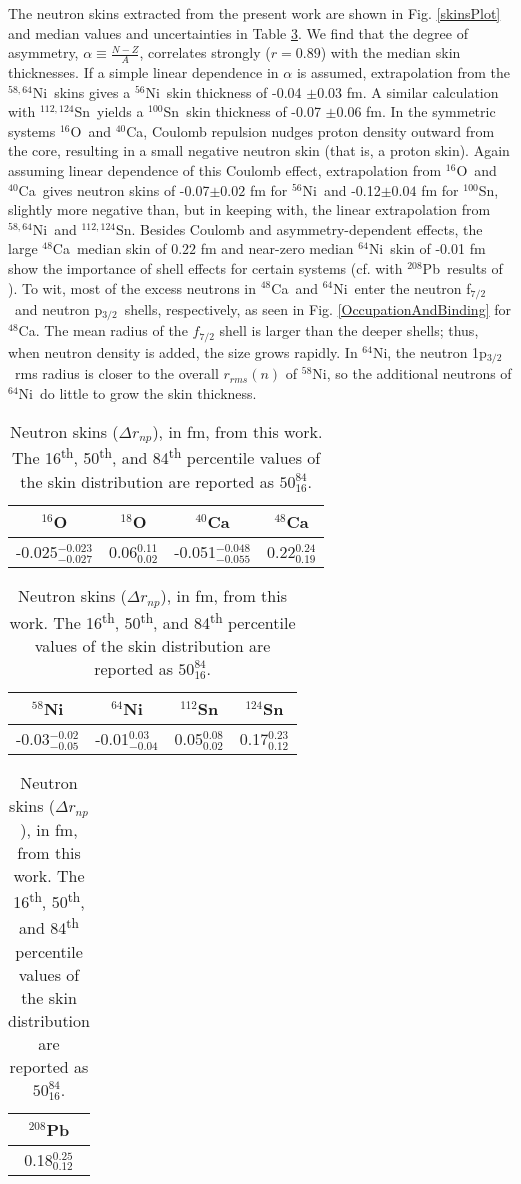 \documentclass[twocolumn,secnumarabic,amssymb, nobibnotes, aps, prl, superscriptaddress, nobalancelastpage]{revtex4-1}
\newcommand{\oSix}{\ensuremath{^{16}}O}
\newcommand{\oEight}{\ensuremath{^{18}}O}
\newcommand{\caForty}{\ensuremath{^{40}}C\lowercase{a}}
\newcommand{\caEight}{\ensuremath{^{48}}C\lowercase{a}}
\newcommand{\niSix}{\ensuremath{^{56}}N\lowercase{i}}
\newcommand{\niEight}{\ensuremath{^{58}}N\lowercase{i}}
\newcommand{\niFour}{\ensuremath{^{64}}N\lowercase{i}}
\newcommand{\niEightFour}{\ensuremath{^{58,64}}N\lowercase{i}}
\newcommand{\snHundred}{\ensuremath{^{100}}S\lowercase{n}}
\newcommand{\snTwelve}{\ensuremath{^{112}}S\lowercase{n}}
\newcommand{\snFour}{\ensuremath{^{124}}S\lowercase{n}}
\newcommand{\snTwelveFour}{\ensuremath{^{112,124}}S\lowercase{n}}
\newcommand{\pbEight}{\ensuremath{^{208}}P\lowercase{b}}
\newcommand{\pThree}{p\ensuremath{_{3/2}}}
\newcommand{\fSeven}{f\ensuremath{_{7/2}}}
\begin{document}
The neutron skins extracted from the present work
are shown in Fig. \ref{skinsPlot} and median values and uncertainties in Table \ref{SkinsTable}.
We find that the degree of asymmetry, $\alpha \equiv \frac{N-Z}{A}$,
correlates strongly ($r=0.89$) with the median skin thicknesses.
If a simple linear dependence in $\alpha$ is assumed, extrapolation from the
\niEightFour\ skins gives a \niSix\ skin thickness of -0.04 $\pm$0.03 fm.
A similar calculation with \snTwelveFour\ yields a \snHundred\ skin thickness of -0.07 $\pm$0.06 fm.
In the symmetric systems \oSix\ and \caForty, Coulomb repulsion nudges
proton density outward from the core, resulting in a small negative neutron skin (that is, a proton
skin). Again assuming linear dependence of this Coulomb effect,
extrapolation from \oSix\ and \caForty\
gives neutron skins of -0.07$\pm 0.02$ fm for \niSix\ and
-0.12$\pm 0.04$ fm for \snHundred, slightly more negative than, but in keeping with, the linear
extrapolation from \niEightFour\ and \snTwelveFour. Besides Coulomb and asymmetry-dependent effects,
the large \caEight\ median skin of $0.22$ fm and near-zero median \niFour\ skin of -0.01 fm show
the importance of shell effects for certain systems (cf. with \pbEight\ results of 
\cite{Atkinson2020}). To wit, most 
of the excess neutrons in \caEight\ and \niFour\ enter the neutron \fSeven\ and neutron \pThree\ shells,
respectively, as seen in Fig. \ref{OccupationAndBinding} for \caEight. The mean radius of
the $\fSeven$ shell is larger than the deeper shells; thus, when neutron density is added,
the size grows rapidly. In \niFour, the neutron 1\pThree\ rms radius is
closer to the overall $r_{rms}(n)$ of \niEight, so the additional neutrons of \niFour\ do little to grow
the skin thickness.

\begin{table}[tb]
    \centering
    \caption{
        Neutron skins ($\Delta r_{np}$), in fm, from this work. The 16\textsuperscript{th},
    50\textsuperscript{th}, and 84\textsuperscript{th} percentile values of the skin distribution
    are reported as $\text{50}^{\text{84}}_{\text{16}}$.
}
    \bgroup
    \def\arraystretch{1.8}%
    \begin{tabular}{c c c c}
        \oSix & \oEight  & \caForty & \caEight \\
        \hline
        -0.025$^{-0.023}_{-0.027}$ &
        0.06$^{0.11}_{0.02}$ & 
        -0.051$^{-0.048}_{-0.055}$ &
        0.22$^{0.24}_{0.19}$ \\
    \end{tabular}
    \begin{tabular}{c c c c}
        \niEight & \niFour & \snTwelve & \snFour \\
        \hline
        -0.03$^{-0.02}_{-0.05}$ &
        -0.01$^{0.03}_{-0.04}$ &
        0.05$^{0.08}_{0.02}$ &
        0.17$^{0.23}_{0.12}$ \\
    \end{tabular}
    \begin{tabular}{c}
        \pbEight \\
        \hline
        0.18$^{0.25}_{0.12}$ \\
    \end{tabular}
    \egroup
    \label{SkinsTable}
\end{table}
\end{document}
